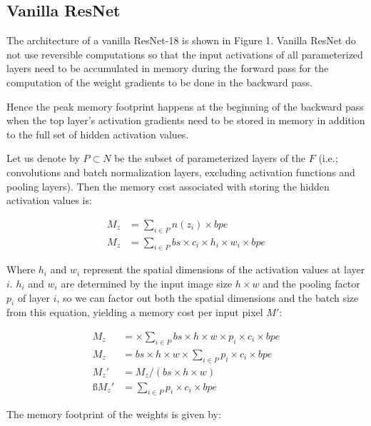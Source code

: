 \documentclass[twocolumn]{bmcart}
\begin{document}
\subsection{Vanilla ResNet}

The architecture of a vanilla ResNet-18 is shown in Figure 1.
Vanilla ResNet do not use reversible computations so that the input activations of all parameterized layers need to be accumulated in memory during the forward pass for the computation of the weight gradients to be done in the backward pass.

Hence the peak memory footprint happens at the beginning of the backward pass when the top layer's activation gradients need to be stored in memory in addition to the full set of hidden activation values.

Let us denote by $P \subset N$ be the subset of parameterized layers of the $F$ (i.e.; convolutions and batch normalization layers, excluding activation functions and pooling layers). Then the memory cost associated with storing the hidden activation values is: 

\begin{subequations}
\begin{align}
M_{z} &= \sum_{i \in P} n(z_i) \times bpe \\
M_{z} &= \sum_{i \in P} bs \times c_i \times h_i \times w_i \times bpe 
\end{align}
\end{subequations}

Where $h_i$ and $w_i$ represent the spatial dimensions of the activation values at layer $i$.
$h_i$ and $w_i$ are determined by the input image size $h \times w$ and the pooling factor $p_i$ of layer $i$, so we can factor out both the spatial dimensions and the batch size from this equation, yielding a memory cost per input pixel $M'$:

\begin{subequations}
\begin{align}
M_{z} &= \times \sum_{i \in P} bs \times h \times w \times p_i \times c_i \times bpe \\
M_{z} &= bs \times h \times w \times \sum_{i \in P} p_i \times c_i \times bpe \\
M_{z}' &= M_{z} / (bs \times h \times w)  \\ß
M_{z}' &= \sum_{i \in P} p_i \times c_i \times bpe 
\end{align}
\end{subequations}

The memory footprint of the weights is given by:
\end{document}
